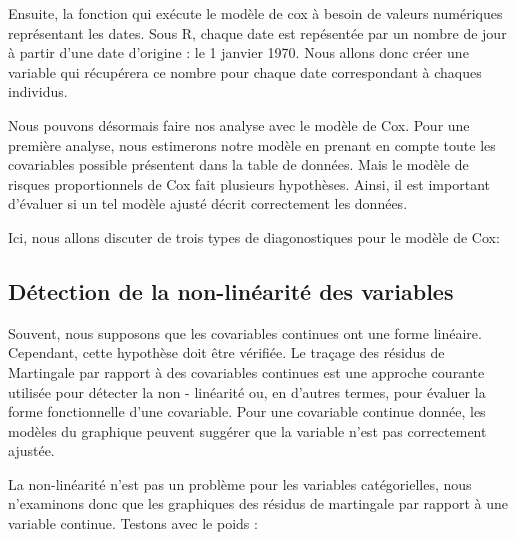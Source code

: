\documentclass[
]{article}
\begin{document}
Ensuite, la fonction qui exécute le modèle de cox à besoin de valeurs
numériques représentant les dates. Sous R, chaque date est repésentée
par un nombre de jour à partir d'une date d'origine : le 1 janvier 1970.
Nous allons donc créer une variable qui récupérera ce nombre pour chaque
date correspondant à chaques individus.

Nous pouvons désormais faire nos analyse avec le modèle de Cox. Pour une
première analyse, nous estimerons notre modèle en prenant en compte
toute les covariables possible présentent dans la table de données. Mais
le modèle de risques proportionnels de Cox fait plusieurs hypothèses.
Ainsi, il est important d'évaluer si un tel modèle ajusté décrit
correctement les données.

Ici, nous allons discuter de trois types de diagonostiques pour le
modèle de Cox:

\hypertarget{duxe9tection-de-la-non-linuxe9arituxe9-des-variables}{%
\subsection{Détection de la non-linéarité des
variables}\label{duxe9tection-de-la-non-linuxe9arituxe9-des-variables}}

Souvent, nous supposons que les covariables continues ont une forme
linéaire. Cependant, cette hypothèse doit être vérifiée. Le traçage des
résidus de Martingale par rapport à des covariables continues est une
approche courante utilisée pour détecter la non - linéarité ou, en
d'autres termes, pour évaluer la forme fonctionnelle d'une covariable.
Pour une covariable continue donnée, les modèles du graphique peuvent
suggérer que la variable n'est pas correctement ajustée.

La non-linéarité n'est pas un problème pour les variables catégorielles,
nous n'examinons donc que les graphiques des résidus de martingale par
rapport à une variable continue. Testons avec le poids :
\end{document}
